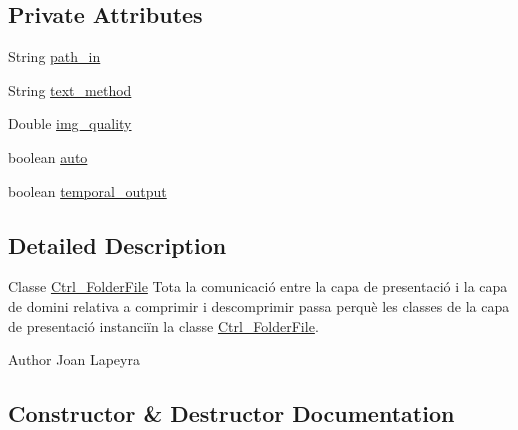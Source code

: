 \subsection*{Private Attributes}
\begin{DoxyCompactItemize}
\item 
String \hyperlink{classdomini_1_1folders_1_1Ctrl__FolderFile_a0d3946bb2832a1f34d0c2227df5c71c4}{path\+\_\+in}
\item 
String \hyperlink{classdomini_1_1folders_1_1Ctrl__FolderFile_a75ef571be454360b835f552d2cf20741}{text\+\_\+method}
\item 
Double \hyperlink{classdomini_1_1folders_1_1Ctrl__FolderFile_a7990a74c394d53a58ebbf4a7872c700d}{img\+\_\+quality}
\item 
boolean \hyperlink{classdomini_1_1folders_1_1Ctrl__FolderFile_a522ecbf2a1426984671134e062491b75}{auto}
\item 
boolean \hyperlink{classdomini_1_1folders_1_1Ctrl__FolderFile_a0db81590abe27b21a9b8c37633c86fa6}{temporal\+\_\+output}
\end{DoxyCompactItemize}


\subsection{Detailed Description}
Classe \hyperlink{classdomini_1_1folders_1_1Ctrl__FolderFile}{Ctrl\+\_\+\+Folder\+File} Tota la comunicació entre la capa de presentació i la capa de domini relativa a comprimir i descomprimir passa perquè les classes de la capa de presentació instanciïn la classe \hyperlink{classdomini_1_1folders_1_1Ctrl__FolderFile}{Ctrl\+\_\+\+Folder\+File}. 

\begin{DoxyAuthor}{Author}
Joan Lapeyra 
\end{DoxyAuthor}


\subsection{Constructor \& Destructor Documentation}
\mbox{\label{classdomini_1_1folders_1_1Ctrl__FolderFile_aabe2038931ca63100a2fc4b12936142d}} 
